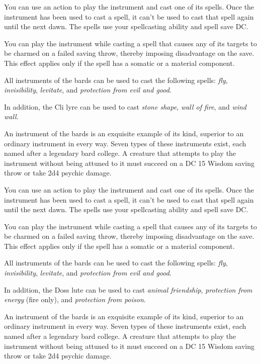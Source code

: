 \documentclass[10pt,a4paper,twoside,bg=print,twocolumn,openany,nodeprecatedcode]{dndbook}
\begin{document}
You can use an action to play the instrument and cast one of its spells. Once the instrument has been used to cast a spell, it can't be used to cast that spell again until the next dawn. The spells use your spellcasting ability and spell save DC.

You can play the instrument while casting a spell that causes any of its targets to be charmed on a failed saving throw, thereby imposing disadvantage on the save. This effect applies only if the spell has a somatic or a material component.

All instruments of the bards can be used to cast the following spells: \textit{fly}, \textit{invisibility}, \textit{levitate}, and \textit{protection from evil and good}.

In addition, the Cli lyre can be used to cast \textit{stone shape}, \textit{wall of fire}, and \textit{wind wall}.

An instrument of the bards is an exquisite example of its kind, superior to an ordinary instrument in every way. Seven types of these instruments exist, each named after a legendary bard college. A creature that attempts to play the instrument without being attuned to it must succeed on a DC 15 Wisdom saving throw or take 2d4 psychic damage.

You can use an action to play the instrument and cast one of its spells. Once the instrument has been used to cast a spell, it can't be used to cast that spell again until the next dawn. The spells use your spellcasting ability and spell save DC.

You can play the instrument while casting a spell that causes any of its targets to be charmed on a failed saving throw, thereby imposing disadvantage on the save. This effect applies only if the spell has a somatic or a material component.

All instruments of the bards can be used to cast the following spells: \textit{fly}, \textit{invisibility}, \textit{levitate}, and \textit{protection from evil and good}.

In addition, the Doss lute can be used to cast \textit{animal friendship}, \textit{protection from energy} (fire only), and \textit{protection from poison}.

An instrument of the bards is an exquisite example of its kind, superior to an ordinary instrument in every way. Seven types of these instruments exist, each named after a legendary bard college. A creature that attempts to play the instrument without being attuned to it must succeed on a DC 15 Wisdom saving throw or take 2d4 psychic damage.
\end{document}
